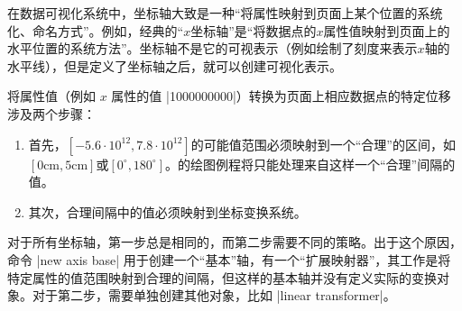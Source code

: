 
在数据可视化系统中，坐标轴大致是一种``将属性映射到页面上某个位置的系统化、命名方式''。例如，经典的``$x$坐标轴''是``将数据点的$x$属性值映射到页面上的水平位置的系统方法''。坐标轴不是它的可视表示（例如绘制了刻度来表示$x$轴的水平线），但是定义了坐标轴之后，就可以创建可视化表示。


将属性值（例如 $x$ 属性的值 |1000000000|）转换为页面上相应数据点的特定位移涉及两个步骤：
%
\begin{enumerate}
    \item 首先，$[-5.6\cdot 10^{12},7.8\cdot 10^{12}]$的可能值范围必须映射到一个``合理''的区间，如$[0\mathrm{cm},5\mathrm{cm}]$或$[0^\circ,180^\circ]$。\tikzname 的绘图例程将只能处理来自这样一个``合理''间隔的值。
    \item 其次，合理间隔中的值必须映射到坐标变换系统。
\end{enumerate}
%
%
对于所有坐标轴，第一步总是相同的，而第二步需要不同的策略。出于这个原因，命令 |new axis base| 用于创建一个``基本''轴，有一个``扩展映射器''，其工作是将特定属性的值范围映射到合理的间隔，但这样的基本轴并没有定义实际的变换对象。对于第二步，需要单独创建其他对象，比如 |linear transformer|。


